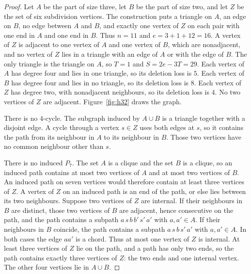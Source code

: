 \documentclass[ASNA]{USG}
\theoremstyle{WBstyletwo}
\numberwithin{equation}{section}
\begin{document}
\begin{proof}
Let $A$ be the part of size three, let $B$ be the part of size two, and let $Z$ be the set of six subdivision vertices. The construction puts a triangle on $A$, an edge on $B$, no edge between $A$ and $B$, and exactly one vertex of $Z$ on each pair with one end in $A$ and one end in $B$. Thus $n=11$ and $e=3+1+12=16$. A vertex of $Z$ is adjacent to one vertex of $A$ and one vertex of $B$, which are nonadjacent, and no vertex of $Z$ lies in a triangle with an edge of $A$ or with the edge of $B$. The only triangle is the triangle on $A$, so $T=1$ and $S=2e-3T=29$. Each vertex of $A$ has degree four and lies in one triangle, so its deletion loss is $5$. Each vertex of $B$ has degree four and lies in no triangle, so its deletion loss is $8$. Each vertex of $Z$ has degree two, with nonadjacent neighbours, so its deletion loss is $4$. No two vertices of $Z$ are adjacent. Figure~\ref{fig:h32} draws the graph.

There is no $4$-cycle. The subgraph induced by $A\cup B$ is a triangle together with a disjoint edge. A cycle through a vertex $s\in Z$ uses both edges at $s$, so it contains the path from its neighbour in $A$ to its neighbour in $B$. Those two vertices have no common neighbour other than $s$.

There is no induced $P_7$. The set $A$ is a clique and the set $B$ is a clique, so an induced path contains at most two vertices of $A$ and at most two vertices of $B$. An induced path on seven vertices would therefore contain at least three vertices of $Z$. A vertex of $Z$ on an induced path is an end of the path, or else lies between its two neighbours. Suppose two vertices of $Z$ are internal. If their neighbours in $B$ are distinct, those two vertices of $B$ are adjacent, hence consecutive on the path, and the path contains a subpath $a\,s\,b\,b'\,s'\,a'$ with $a,a'\in A$. If their neighbours in $B$ coincide, the path contains a subpath $a\,s\,b\,s'\,a'$ with $a,a'\in A$. In both cases the edge $aa'$ is a chord. Thus at most one vertex of $Z$ is internal. At least three vertices of $Z$ lie on the path, and a path has only two ends, so the path contains exactly three vertices of $Z$: the two ends and one internal vertex. The other four vertices lie in $A\cup B$.


\end{proof}
\end{document}
